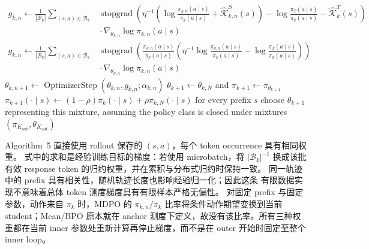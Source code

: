 \begin{algorithm}[ht]
\begin{algorithmic}[1]
            \State $\begin{aligned}g_{k,n}\gets\frac1{|\mathcal B_k|}\sum_{(s,a)\in\mathcal B_k}&\operatorname{stopgrad}\!\left(\eta^{-1}\left(\log\frac{\pi_{k,n}(a\mid s)}{\pi_k(a\mid s)}+\widehat{\mathcal K}_{k,n}^{S}(s)\right)-\log\frac{\pi_T(a\mid s)}{\pi_k(a\mid s)}-\widehat{\mathcal K}_k^{T}(s)\right)\\&{}\cdot\nabla_{\theta_{k,n}}\log\pi_{k,n}(a\mid s)\end{aligned}$
            \State $\begin{aligned}g_{k,n}\gets\frac1{|\mathcal B_k|}\sum_{(s,a)\in\mathcal B_k}&\operatorname{stopgrad}\!\left(\frac{\pi_{k,n}(a\mid s)}{\pi_k(a\mid s)}\left(\eta^{-1}\log\frac{\pi_{k,n}(a\mid s)}{\pi_k(a\mid s)}-\log\frac{\pi_T(a\mid s)}{\pi_k(a\mid s)}\right)\right)\\&{}\cdot\nabla_{\theta_{k,n}}\log\pi_{k,n}(a\mid s)\end{aligned}$
        \EndIf
        \State $\theta_{k,n+1}\gets\operatorname{OptimizerStep}(\theta_{k,n},g_{k,n};\alpha_{k,n})$ 
    \EndFor
        \State $\theta_{k+1}\gets\theta_{k,N}$ and $\pi_{k+1}\gets\pi_{\theta_{k+1}}$
    \Else
        \State $\pi_{k+1}(\cdot\mid s)\gets(1-\rho)\pi_k(\cdot\mid s)+\rho\pi_{k,N}(\cdot\mid s)$ for every prefix $s$
        \State choose $\theta_{k+1}$ representing this mixture, assuming the policy class is closed under mixtures 
    \EndIf
\EndFor
\State \Return $(\pi_{K_{\mathrm{out}}},\theta_{K_{\mathrm{out}}})$
\end{algorithmic}
\end{algorithm}

Algorithm~5 直接使用 rollout 保存的 $(s,a)$，每个 token occurrence 具有相同权重。
式中的求和是经验训练目标的梯度：若使用 microbatch，将 $|\mathcal B_k|^{-1}$
换成该批有效 response token 的归约权重，并在累积与分布式归约时保持一致。
同一轨迹中的 prefix 具有相关性，随机轨迹长度也影响经验归一化；因此这条
有限数据实现不意味着总体 token 测度梯度具有有限样本严格无偏性。
对固定 prefix 与固定参数，动作来自 $\pi_k$ 时，MDPO 的
$\pi_{k,n}/\pi_k$ 比率将条件动作期望变换到当前 student；Mean/BPO
原本就在 anchor 测度下定义，故没有该比率。所有三种权重都在当前 inner
参数处重新计算再停止梯度，而不是在 outer 开始时固定至整个 inner loop。

